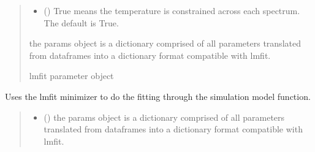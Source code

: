 \documentclass[letterpaper,10pt,english]{sphinxmanual}
\begin{document}
\begin{fulllineitems}
\begin{fulllineitems}
\begin{quote}
\begin{description}
\begin{itemize}
\item {} 
\sphinxAtStartPar
{} (\sphinxstyleliteralemphasis{\sphinxupquote{, }}) \textendash{} True means the temperature is constrained across each spectrum. The default is True.

\end{itemize}

\sphinxAtStartPar
{} \textendash{} the params object is a dictionary comprised of all parameters translated from dataframes into a dictionary format compatible with lmfit.

\sphinxAtStartPar
lmfit parameter object

\end{description}\end{quote}

\end{fulllineitems}


\begin{fulllineitems}
\label{\detokenize{MATS:MATS.fit_dataset.Fit_DataSet.fit_data}}
\pysigstartsignatures
{}
\pysigstopsignatures
\sphinxAtStartPar
Uses the lmfit minimizer to do the fitting through the simulation model function.
\begin{quote}\begin{description}
\begin{itemize}
\item {} 
\sphinxAtStartPar
{} () \textendash{} the params object is a dictionary comprised of all parameters translated from dataframes into a dictionary format compatible with lmfit.


\end{itemize}
\end{description}
\end{quote}
\end{fulllineitems}
\end{fulllineitems}
\end{document}
